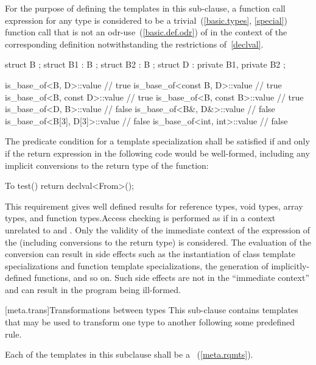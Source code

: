 \pnum
For the purpose of defining the templates in this sub-clause,
a function call expression  for any type 
is considered to be a trivial~(\ref{basic.types}, \ref{special}) function call
that is not an odr-use~(\ref{basic.def.odr}) of 
in the context of the corresponding definition
notwithstanding the restrictions of~\ref{declval}.

\pnum
\enterexample
\begin{codeblock}
struct B {};
struct B1 : B {};
struct B2 : B {};
struct D : private B1, private B2 {};

is_base_of<B, D>::value         // true
is_base_of<const B, D>::value   // true
is_base_of<B, const D>::value   // true
is_base_of<B, const B>::value   // true
is_base_of<D, B>::value         // false
is_base_of<B&, D&>::value       // false
is_base_of<B[3], D[3]>::value   // false
is_base_of<int, int>::value     // false
\end{codeblock}
\exitexample

\pnum
The predicate condition for a template specialization 
shall be satisfied if and only if the return expression in the following code would be
well-formed, including any implicit conversions to the return type of the function:

\begin{codeblock}
To test() {
  return declval<From>();
}
\end{codeblock}

\enternote This requirement gives well defined results for reference types, void
types, array types, and function types.\exitnote Access checking is performed as
if in a context unrelated to  and . Only the validity of
the immediate context of the expression of the 
(including conversions to the return type) is considered. \enternote The
evaluation of the conversion can result in side effects such as the
instantiation of class template specializations and function template
specializations, the generation of implicitly-defined functions, and so on. Such
side effects are not in the ``immediate context'' and can result in the program
being ill-formed. \exitnote

[meta.trans]{Transformations between types}
\pnum
This sub-clause contains templates that may be used to transform one
type to another following some predefined rule.

\pnum
Each of the templates in this subclause shall be a
~(\ref{meta.rqmts}).

